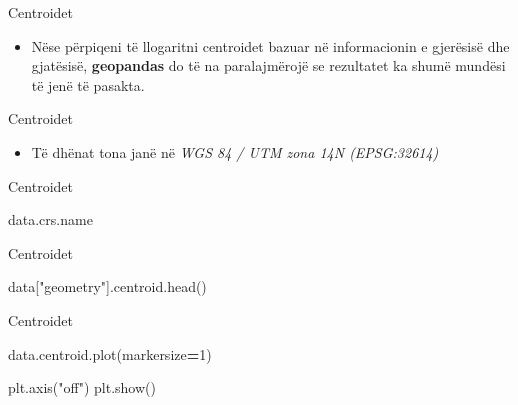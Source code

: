 \documentclass[
  ignorenonframetext,
]{beamer}
\newenvironment{Shaded}{\begin{snugshade}}{\end{snugshade}}
\newcommand{\DecValTok}[1]{\textcolor[rgb]{0.00,0.00,0.81}{#1}}
\newcommand{\NormalTok}[1]{#1}
\newcommand{\OperatorTok}[1]{\textcolor[rgb]{0.81,0.36,0.00}{\textbf{#1}}}
\newcommand{\StringTok}[1]{\textcolor[rgb]{0.31,0.60,0.02}{#1}}
\providecommand{\tightlist}{%
  \setlength{\itemsep}{0pt}\setlength{\parskip}{0pt}}
\begin{document}
\begin{frame}{Centroidet}
\protect\hypertarget{centroidet-2}{}
\begin{itemize}
\tightlist
\item
  Nëse përpiqeni të llogaritni centroidet bazuar në informacionin e
  gjerësisë dhe gjatësisë, \textbf{geopandas} do të na paralajmërojë se
  rezultatet ka shumë mundësi të jenë të pasakta.
\end{itemize}
\end{frame}

\begin{frame}{Centroidet}
\protect\hypertarget{centroidet-3}{}
\begin{itemize}
\tightlist
\item
  Të dhënat tona janë në \emph{WGS 84 / UTM zona 14N (EPSG:32614)}
\end{itemize}
\end{frame}

\begin{frame}[fragile]{Centroidet}
\protect\hypertarget{centroidet-4}{}

\begin{Shaded}
\begin{Highlighting}[]
\NormalTok{data.crs.name}
\end{Highlighting}
\end{Shaded}
\end{frame}

\begin{frame}[fragile]{Centroidet}
\protect\hypertarget{centroidet-5}{}

\begin{Shaded}
\begin{Highlighting}[]
\NormalTok{data[}\StringTok{"geometry"}\NormalTok{].centroid.head()}
\end{Highlighting}
\end{Shaded}
\end{frame}

\begin{frame}[fragile]{Centroidet}
\protect\hypertarget{centroidet-6}{}

\begin{Shaded}
\begin{Highlighting}[]
\NormalTok{data.centroid.plot(markersize}\OperatorTok{=}\DecValTok{1}\NormalTok{)}

\NormalTok{plt.axis(}\StringTok{"off"}\NormalTok{)}
\NormalTok{plt.show()}
\end{Highlighting}
\end{Shaded}
\end{frame}
\end{document}
